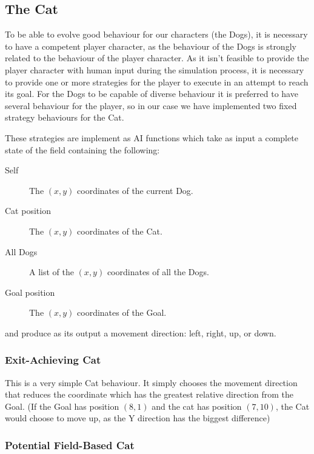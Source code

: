 \subsection{The Cat}
\label{sec:cat}

To be able to evolve good behaviour for our characters (the Dogs), it is
necessary to have a competent player character, as the behaviour of the Dogs is
strongly related to the behaviour of the player character. As it isn't feasible
to provide the player character with human input during the simulation process,
it is necessary to provide one or more strategies for the player to execute in
an attempt to reach its goal. For the Dogs to be capable of diverse behaviour it
is preferred to have several behaviour for the player, so in our case we have
implemented two fixed strategy behaviours for the Cat.

These strategies are implement as AI functions which take as input a complete
state of the field containing the following:
\begin{description}
\item[Self] The \((x,y)\) coordinates of the current Dog.
\item[Cat position] The \((x,y)\) coordinates of the Cat.
\item[All Dogs] A list of the \((x,y)\) coordinates of all the Dogs.
\item[Goal position] The \((x,y)\) coordinates of the Goal.
\end{description}

and produce as its output a movement direction: left, right, up, or down.

\subsubsection{Exit-Achieving Cat}
\label{sec:exit-achieving-cat}

This is a very simple Cat behaviour. It simply chooses the movement direction
that reduces the coordinate which has the greatest relative direction from the
Goal. (If the Goal has position \((8,1)\) and the cat has position \((7,10)\),
the Cat would choose to move up, as the Y direction has the biggest difference)

\subsubsection{Potential Field-Based Cat}
\label{sec:potent-field-based}

